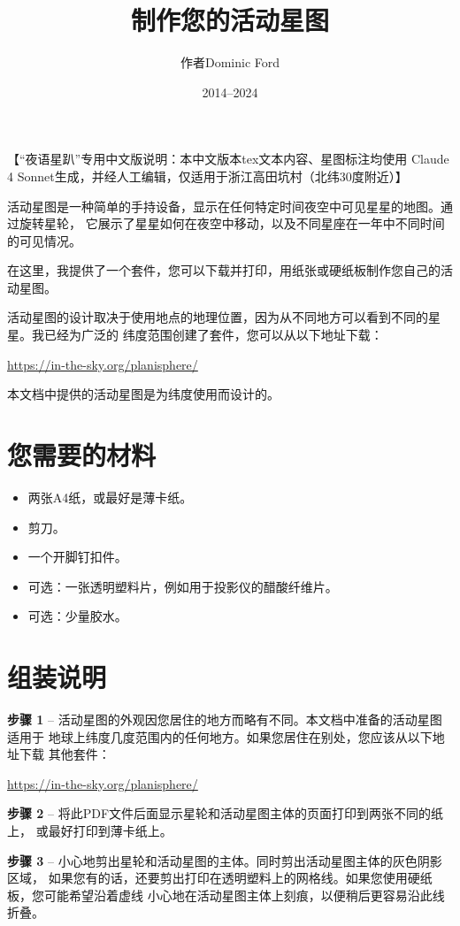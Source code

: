 \documentclass[a4paper,onecolumn,10pt]{article}
\title{制作您的活动星图}
\author{作者Dominic Ford}
\date{2014--2024}
\begin{document}
\maketitle
\setcounter{footnote}{1}

【“夜语星趴”专用中文版说明：本中文版本tex文本内容、星图标注均使用
Claude 4 Sonnet生成，并经人工编辑，仅适用于浙江高田坑村（北纬30度附近）】

活动星图是一种简单的手持设备，显示在任何特定时间夜空中可见星星的地图。通过旋转星轮，
它展示了星星如何在夜空中移动，以及不同星座在一年中不同时间的可见情况。

在这里，我提供了一个套件，您可以下载并打印，用纸张或硬纸板制作您自己的活动星图。

活动星图的设计取决于使用地点的地理位置，因为从不同地方可以看到不同的星星。我已经为广泛的
纬度范围创建了套件，您可以从以下地址下载：

\url{https://in-the-sky.org/planisphere/}

本文档中提供的活动星图是为纬度使用而设计的。
 
\section*{您需要的材料}

\begin{itemize}
\item 两张A4纸，或最好是薄卡纸。
\item 剪刀。
\item 一个开脚钉扣件。
\item 可选：一张透明塑料片，例如用于投影仪的醋酸纤维片。
\item 可选：少量胶水。
\end{itemize}

\section*{组装说明}

{\bf 步骤 1} -- 活动星图的外观因您居住的地方而略有不同。本文档中准备的活动星图适用于
地球上纬度几度范围内的任何地方。如果您居住在别处，您应该从以下地址下载
其他套件：

\url{https://in-the-sky.org/planisphere/}

{\bf 步骤 2} -- 将此PDF文件后面显示星轮和活动星图主体的页面打印到两张不同的纸上，
或最好打印到薄卡纸上。

{\bf 步骤 3} -- 小心地剪出星轮和活动星图的主体。同时剪出活动星图主体的灰色阴影区域，
如果您有的话，还要剪出打印在透明塑料上的网格线。如果您使用硬纸板，您可能希望沿着虚线
小心地在活动星图主体上刻痕，以便稍后更容易沿此线折叠。
\end{document}
